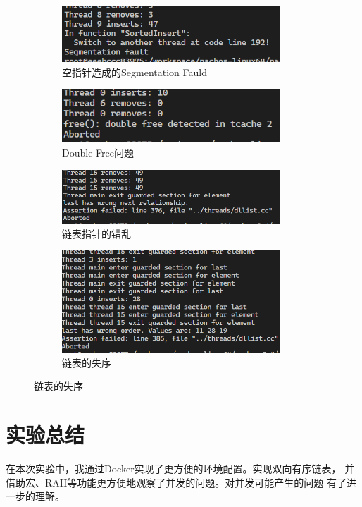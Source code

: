 \documentclass[a4paper,twoside]{article}
\begin{document}
\begin{spacing}{1.2}
\begin{figure}[htb]
	\centering
	\caption{错误信息}
	\label{fig:errors}
	\begin{subfigure}[b]{0.4\textwidth}
		\centering
		\includegraphics[width=0.9\textwidth]{images/segfault.png}
		\caption{空指针造成的Segmentation Fauld}
	\end{subfigure}
	\begin{subfigure}[b]{0.4\textwidth}
		\centering
		\includegraphics[width=0.9\textwidth]{images/dblfree.png}
		\caption{Double Free问题}
	\end{subfigure}
	\begin{subfigure}[b]{0.4\textwidth}
		\centering
		\includegraphics[width=0.9\textwidth]{images/wrongptr.png}
		\caption{链表指针的错乱}
	\end{subfigure}
	\begin{subfigure}[b]{0.4\textwidth}
		\centering
		\includegraphics[width=0.9\textwidth]{images/wrongorder.png}
		\caption{链表的失序}
	\end{subfigure}
\end{figure}

\section{实验总结}

在本次实验中，我通过Docker实现了更方便的环境配置。实现双向有序链表，
并借助宏、RAII等功能更方便地观察了并发的问题。对并发可能产生的问题
有了进一步的理解。



\end{spacing}
\end{document}
